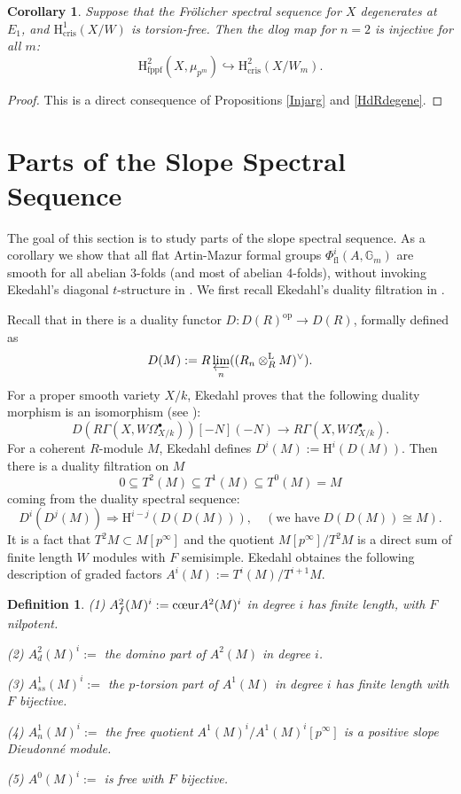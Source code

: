 \documentclass[a4paper,12pt,twoside]{report}
\newtheorem{definition}[theorem]{Definition}
\newtheorem{corollary}[theorem]{Corollary}
\newcommand{\G}{\mathbb{G}}
\newcommand{\cris}{\mathrm{cris}}
\newcommand{\fppf}{\mathrm{fppf}}
\newcommand{\HH}{\mathrm{H}}
\newcommand{\op}{\mathrm{op}}
\newcommand{\fl}{\mathrm{fl}}
\newcommand{\Ld}{\mathrm{L}}
\begin{document}
\begin{corollary}\label{InjCol}
    Suppose that the Fr\"olicher spectral sequence for $X$ degenerates at $E_1$, 
    and $\HH^1_{\cris}(X/W)$ is torsion-free. Then the dlog map for $n=2$ is injective for all $m$: 
    \[\HH^2_{\fppf}(X,\mu_{p^m})\hookrightarrow \HH^2_{\cris}(X/W_m).\]
\end{corollary}
\begin{proof}
    This is a direct consequence of Propositions \ref{Injarg} and \ref{HdRdegene}. 
\end{proof}

\section{Parts of the Slope Spectral Sequence}

The goal of this section is to study parts of the slope spectral sequence.
As a corollary we show that all
flat Artin-Mazur formal groups $\Phi_{\fl}^i(A,\G_m)$ are smooth for all abelian 3-folds 
(and most of abelian 4-folds), without invoking Ekedahl's diagonal $t$-structure in \cite{Ek3}. 
We first recall Ekedahl's duality filtration in \cite{Ek1}. 

Recall that in \cite{Ek1} there is a duality functor $D:D(R)^{\op} \rightarrow D(R)$, formally defined as 
\[D(M):=R\varprojlim_{n}((R_{n}\otimes ^{\Ld}_{R}M)^\vee). \]
For a proper smooth variety $X/k$, Ekedahl proves that the following duality morphism is an isomorphism (see \cite{Ek1}):
\[D(R\Gamma(X,W\Omega^\bullet_{X/k}))[-N](-N)\rightarrow R\Gamma(X,W\Omega^\bullet_{X/k}).\]
For a coherent $R$-module $M$, Ekedahl defines $D^i(M):=\HH^i(D(M))$.
Then there is a duality filtration on $M$ 
\[0\subseteq T^2(M)\subseteq T^1(M)\subseteq T^0(M)=M \] 
coming from the duality spectral sequence: \[D^i(D^j(M))\Rightarrow \HH^{i-j}(D(D(M))),\quad (\text{we have}\;D(D(M))\cong M).\]
It is a fact that $T^2M\subset M[p^\infty]$ and the quotient $M[p^\infty]/T^2M$ 
is a direct sum of finite length $W$ modules with $F$ semisimple. 
Ekedahl obtaines the following description of graded factors $A^i(M):=T^i(M)/T^{i+1}M$.

\begin{definition}    
{\rm (1)} $A^2_f(M)^i:=\text{\rm {c\oe ur}}A^2(M)^i$ in degree $i$ has finite length, with $F$ nilpotent.

{\rm (2)} $A^2_d(M)^i:=$ the domino part of $A^2(M)$ in degree $i$.

{\rm (3)} $A^1_{ss}(M)^i:=$ the $p$-torsion part of $A^1(M)$ in degree $i$ has finite length with $F$ bijective.

{\rm (4)} $A^1_n(M)^i:=$ the free quotient $A^1(M)^i/A^1(M)^i[p^\infty]$ is a positive slope Dieudonné module.

{\rm (5)} $A^0(M)^i:=$ is free with $F$ bijective. 
\end{definition}
\end{document}
